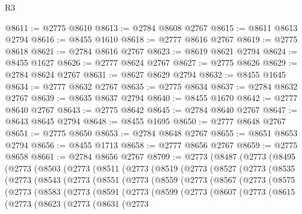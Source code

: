 \begin{lexlean}{R3}
\begin{coremodule}
@8611 := @2775 @8610
@8613 := @2784 @8608 @2767
@8615 := @8611 @8613 @2794
@8616 := @8455 @1610
@8618 := @2777 @8616 @2767
@8619 := @2775 @8618
@8621 := @2784 @8616 @2767
@8623 := @8619 @8621 @2794
@8624 := @8455 @1627
@8626 := @2777 @8624 @2767
@8627 := @2775 @8626
@8629 := @2784 @8624 @2767
@8631 := @8627 @8629 @2794
@8632 := @8455 @1645
@8634 := @2777 @8632 @2767
@8635 := @2775 @8634
@8637 := @2784 @8632 @2767
@8639 := @8635 @8637 @2794
@8640 := @8455 @1670
@8642 := @2777 @8640 @2767
@8643 := @2775 @8642
@8645 := @2784 @8640 @2767
@8647 := @8643 @8645 @2794
@8648 := @8455 @1695
@8650 := @2777 @8648 @2767
@8651 := @2775 @8650
@8653 := @2784 @8648 @2767
@8655 := @8651 @8653 @2794
@8656 := @8455 @1713
@8658 := @2777 @8656 @2767
@8659 := @2775 @8658
@8661 := @2784 @8656 @2767
@8709 := @2773
    (@8487
      (@2773
        (@8495
          (@2773
            (@8503
              (@2773
                (@8511
                  (@2773
                    (@8519
                      (@2773
                        (@8527
                          (@2773
                            (@8535
                              (@2773
                                (@8543
                                  (@2773
                                    (@8551
                                      (@2773
                                        (@8559
                                          (@2773
                                            (@8567
                                              (@2773
                                                (@8575
                                                  (@2773
                                                    (@8583
                                                      (@2773
                                                        (@8591
                                                          (@2773
                                                            (@8599
                                                              (@2773
                                                                (@8607
                                                                  (@2773
                                                                    (@8615
                                                                      (@2773
                                                                        (@8623
                                                                          (@2773
                                                                            (@8631
                                                                              (@2773

\end{coremodule}
\end{lexlean}

